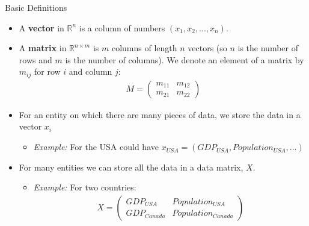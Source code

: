 \documentclass[aspectratio=169,11pt]{beamer}
\begin{document}
\begin{frame}{Basic Definitions}
\begin{itemize}
	\item A {\bf vector} in $\mathbb{R}^n$ is a column of numbers $(x_1,x_2,...,x_n)$.
	\item A {\bf matrix} in $\mathbb{R}^{n\times m}$ is $m$ columns of length $n$ vectors (so $n$ is the number of rows and $m$ is the number of columns). We denote an element of a matrix by $m_{ij}$ for row $i$ and column $j$:
	\begin{align*}
		M = \left(\begin{array}{cc}
			m_{11} & m_{12}\\
			m_{21} & m_{22}
		\end{array}\right)
	\end{align*}
	\item For an entity on which there are many pieces of data, we store the data in a vector $x_i$
	\begin{itemize}
		\item[]\emph{Example:} For the USA could have $x_{USA} = \left(GDP_{USA}, Population_{USA},...\right)$
	\end{itemize}
	\item For many entities we can store all the data in a data matrix, $X$.
	\begin{itemize}
		\item[]\emph{Example:} For two countries:
			\begin{align*}
		X = \left(\begin{array}{ll}
			GDP_{USA} & Population_{USA}\\
			GDP_{Canada} & Population_{Canada}
		\end{array}\right)
			\end{align*}
	\end{itemize}
\end{itemize}

\end{frame}
\end{document}
